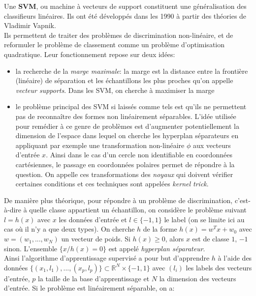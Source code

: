 \documentclass{article}
\theoremstyle{definition}
\newcommand{\R}{\mathbb R}
\begin{document}
\noindent Une \textbf{SVM}, ou machine à vecteurs de support constituent une généralisation des classifieurs linéaires. Ils ont été développés dans les 1990 à partir des théories de Vladimir Vapnik.\\

\noindent Ils permettent de traiter des problèmes de discrimination non-linéaire, et de reformuler le problème de classement comme un problème d'optimisation quadratique. Leur fonctionnement repose sur deux idées:
\begin{itemize}
\item la recherche de la \textit{marge maximale}: la marge est la distance entre la frontière (linéaire) de séparation et les échantillons les plus proches qu'on appelle \textit{vecteur supports}. Dans les SVM, on cherche à maximiser la marge
\item le problème principal des SVM si laissés comme tels est qu'ils ne permettent pas de reconnaître des formes non linéairement séparables. L'idée utilisée pour remédier à ce genre de problèmes est d'augmenter potentiellement la dimension de l'espace dans lequel on cherche les hyperplan séparateurs en appliquant par exemple une transformation non-linéaire $\phi$ aux vecteurs d'entrée $x$. Ainsi dans le cas d'un cercle non identifiable en coordonnées cartésiennes, le passage en coordonnées polaires permet de répondre à la question. On appelle ces transformations des \textit{noyaux} qui doivent vérifier certaines conditions et ces techniques sont appelées \textit{kernel trick}.\\
\end{itemize}

\noindent De manière plus théorique, pour répondre à un problème de discrimination, c'est-à-dire à quelle classe appartient un échantillon, on considère le problème suivant $l=h(x)$ avec $x$ les données d'entrée et $l\in \{-1,1\}$ le label (on se limite ici au cas où il n'y a que deux types). On cherche $h$ de la forme $h(x)=w^Tx+w_0$ avec $w=(w_1,...,w_N)$ un vecteur de poids. Si $h(x)\geq0$, alors $x$ est de classe $1$, $-1$ sinon. L'ensemble $\{x/h(x)=0\}$ est appelé \textit{hyperplan séparateur}.\\

\noindent Ainsi l'algorithme d'apprentissage supervisé a pour but d'apprendre $h$ à l'aide des données $\{(x_1,l_1),...,(x_p,l_p)\}\subset \R^N\times\{-1,1\}$ avec $(l_i)$ les labels des vecteurs d'entrée, $p$ la taille de la base d'apprentissage et $N$ la dimension des vecteurs d'entrée. Si le problème est linéairement séparable, on a:
\end{document}
